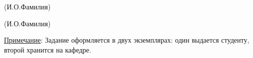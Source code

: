 \begin{titlepage}
\begin{adjustbox}{minipage=0.3\linewidth,valign=T}
\begin{center}
        \scriptsize
        (И.О.Фамилия)
    \end{center}
    \begin{center}
        \footnotesize
        \uline{\hfill\wauthor\hfill}

        \scriptsize
        (И.О.Фамилия)
    \end{center}
\end{adjustbox}
\begin{flushleft}
\uline{Примечание}: Задание оформляется в двух экземплярах: один выдается
студенту, второй хранится на кафедре.
\end{flushleft}

\end{titlepage}
